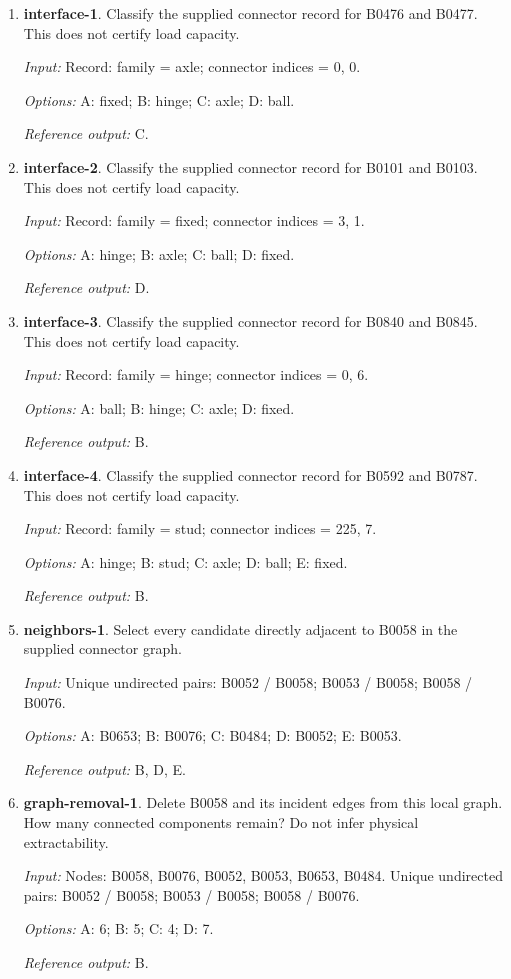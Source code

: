 \begin{enumerate}
\item \textbf{interface-1}. Classify the supplied connector record for B0476 and B0477. This does not certify load capacity.\par {\small \textit{Input:} Record: family = axle; connector indices = 0, 0. \par\textit{Options:} A: fixed; B: hinge; C: axle; D: ball. \par\textit{Reference output:} C.}
\item \textbf{interface-2}. Classify the supplied connector record for B0101 and B0103. This does not certify load capacity.\par {\small \textit{Input:} Record: family = fixed; connector indices = 3, 1. \par\textit{Options:} A: hinge; B: axle; C: ball; D: fixed. \par\textit{Reference output:} D.}
\item \textbf{interface-3}. Classify the supplied connector record for B0840 and B0845. This does not certify load capacity.\par {\small \textit{Input:} Record: family = hinge; connector indices = 0, 6. \par\textit{Options:} A: ball; B: hinge; C: axle; D: fixed. \par\textit{Reference output:} B.}
\item \textbf{interface-4}. Classify the supplied connector record for B0592 and B0787. This does not certify load capacity.\par {\small \textit{Input:} Record: family = stud; connector indices = 225, 7. \par\textit{Options:} A: hinge; B: stud; C: axle; D: ball; E: fixed. \par\textit{Reference output:} B.}
\item \textbf{neighbors-1}. Select every candidate directly adjacent to B0058 in the supplied connector graph.\par {\small \textit{Input:} Unique undirected pairs: B0052 / B0058; B0053 / B0058; B0058 / B0076. \par\textit{Options:} A: B0653; B: B0076; C: B0484; D: B0052; E: B0053. \par\textit{Reference output:} B, D, E.}
\item \textbf{graph-removal-1}. Delete B0058 and its incident edges from this local graph. How many connected components remain? Do not infer physical extractability.\par {\small \textit{Input:} Nodes: B0058, B0076, B0052, B0053, B0653, B0484. Unique undirected pairs: B0052 / B0058; B0053 / B0058; B0058 / B0076. \par\textit{Options:} A: 6; B: 5; C: 4; D: 7. \par\textit{Reference output:} B.}

\end{enumerate}
